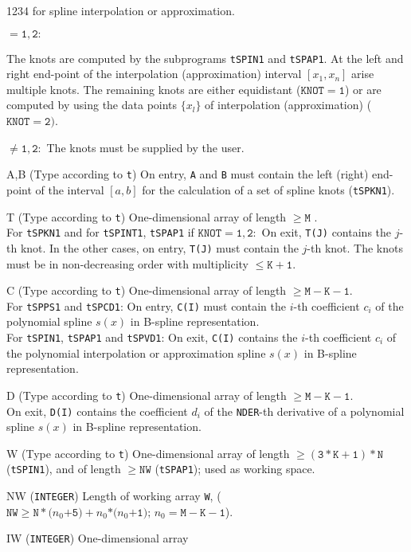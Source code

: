 \begin{DLtt}{1234}
for spline interpolation or approximation.
\item[] $\mathtt{=1,2:}$ \parbox[t]{140mm}{
The knots are computed by the subprograms {\tt tSPIN1} and {\tt tSPAP1}.
At the left and right end-point of the interpolation (approximation)
interval $[x_1,x_n]$ arise multiple knots.
The remaining knots are either equidistant ($\mathtt{KNOT=1}$) or are
computed by using the data points $\{x_l\}$ of interpolation
(approximation) ($\mathtt{KNOT=2})$.}
\item[] $\mathtt{\ne 1,2:}$ The knots must be supplied by the user.
\item[A,B] (Type according to {\tt t}) On entry, {\tt A} and {\tt B}
must contain the left (right) end-point of the interval $[a,b]$ for
the calculation of a set of spline  knots ({\tt tSPKN1}).
\item[T]  (Type according to {\tt t}) One-dimensional array of length
 $\mathtt{ \ge M}$ . \\
 For {\tt tSPKN1} and for {\tt tSPINT1}, {\tt tSPAP1} if
 $\mathtt{KNOT = 1,2:}$
 On exit, {\tt T(J)} contains the $j$-th knot.
 In the other cases, on entry, {\tt T(J)} must contain the $j$-th knot.
 The knots must be in non-decreasing order with multiplicity
 $\mathtt{\le K+1}$.
\item[C] (Type according to {\tt t}) One-dimensional
array of length $\mathtt{ \ge M-K-1}$. \\
For {\tt tSPPS1} and {\tt tSPCD1}: On entry, {\tt C(I)} must contain
the $i$-th coefficient $c_i$ of the polynomial spline $s(x)$ in B-spline
representation. \\
For {\tt tSPIN1}, {\tt tSPAP1} and {\tt tSPVD1}: On exit, {\tt C(I)}
contains the $i$-th coefficient $c_i$ of the polynomial interpolation
or approximation spline $s(x)$ in B-spline representation.
\item[D] (Type according to {\tt t}) One-dimensional
array of length $\mathtt{ \ge M-K-1}$. \\
On exit, {\tt D(I)} contains the coefficient $d_i$ of the {\tt NDER}-th
derivative of a polynomial spline $s(x)$ in B-spline representation.
\item[W] (Type according to {\tt t}) One-dimensional array of length
$\mathtt{\ge (3*K+1)*N}$ ({\tt tSPIN1}), and of length
$\mathtt{\ge NW}$ ({\tt tSPAP1}); used as working space.
\item[NW] ({\tt INTEGER}) Length of working array {\tt W},
($\mathtt{NW \ge N*(} n_0 \mathtt{+5)+} n_0 \mathtt{*(} n_0\mathtt{+1});
\,n_0 \mathtt{ = M-K-1}$).
\item[IW] ({\tt INTEGER}) One-dimensional array

\end{DLtt}
